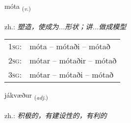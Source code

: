 \documentclass[frontgrid, backgrid]{flacards}\usepackage[]{graphicx}\usepackage[]{xcolor}
\begin{document}
\renewcommand{\blhead}{\vskip5pt {\small\bfseries\footnotesize Sagnorð | 动词 }}
\renewcommand{\bcfoot}{\vskip5pt \hspace{2pt}{\small\bfseries\footnotesize 1K}}


{móta \small{\textsubscript{(\textit{v.})}} \\[1ex] %
\textphonetic{[mouːta]} \\
zh.: \emph{塑造，使成为...形状；讲...做成模型} \\  [2ex]
\renewcommand*{\arraystretch}{0.8}
\begin{tabular}{p{1cm}l}
\textsc{1sg}: & móta -- mótaði -- mótað \\ 
\textsc{2sg}: & mótar -- mótaðir -- mótað \\ 
\textsc{3sg}: & mótar -- mótaði -- mótað \\ 
\end{tabular}
}

\renewcommand{\flhead}{\vskip5pt \fboxsep=0pt {\small\bfseries\footnotesize Lýsingarorð | 形容词}}
\renewcommand{\fcfoot}{\vskip5pt \fboxsep=0pt \hspace{2pt}{\small\bfseries\footnotesize 1K}}

\renewcommand{\blhead}{\vskip5pt {\small\bfseries\footnotesize Lýsingarorð | 形容词 }}
\renewcommand{\bcfoot}{\vskip5pt \hspace{2pt}{\small\bfseries\footnotesize 1K}}


{jákvæður \small{\textsubscript{(\textit{adj.})}} \\[1ex] %
\textphonetic{[jauːkʰvaiðʏr]} \\
zh.: \emph{积极的，有建设性的，有利的} \\  [2ex]
\renewcommand*{\arraystretch}{0.8}
}
\end{document}
